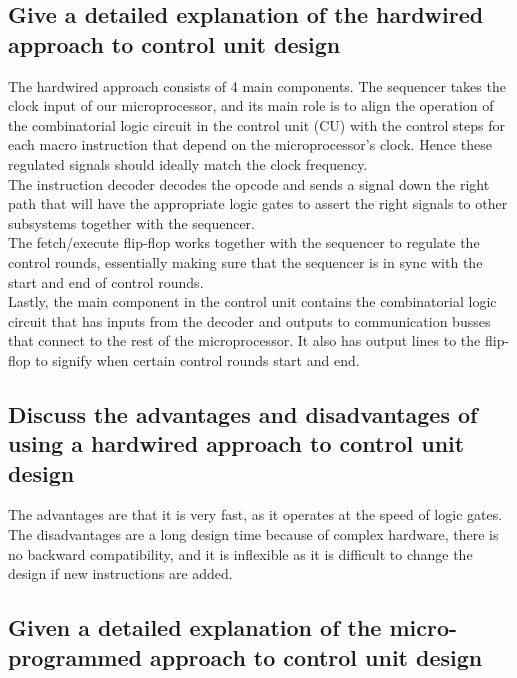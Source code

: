 \documentclass{article}
\begin{document}
\subsection{Give a detailed explanation of the hardwired approach to control unit design}

The hardwired approach consists of 4 main components. The sequencer takes the clock input of our microprocessor, and its main role is to align the operation of the combinatorial logic circuit in the control unit (CU) with the control steps for each macro instruction that depend on the microprocessor's clock. Hence these regulated signals should ideally match the clock frequency. \\
The instruction decoder decodes the opcode and sends a signal down the right path that will have the appropriate logic gates to assert the right signals to other subsystems together with the sequencer. \\
The fetch/execute flip-flop works together with the sequencer to regulate the control rounds, essentially making sure that the sequencer is in sync with the start and end of control rounds.\\
Lastly, the main component in the control unit contains the combinatorial logic circuit that has inputs from the decoder and outputs to communication busses that connect to the rest of the microprocessor. It also has output lines to the flip-flop to signify when certain control rounds start and end.

\subsection{Discuss the advantages and disadvantages of using a hardwired approach to control unit design}

The advantages are that it is very fast, as it operates at the speed of logic gates. \\
The disadvantages are a long design time because of complex hardware, there is no backward compatibility, and it is inflexible as it is difficult to change the design if new instructions are added.

\subsection{Given a detailed explanation of the micro-programmed approach to control unit design}
\end{document}
